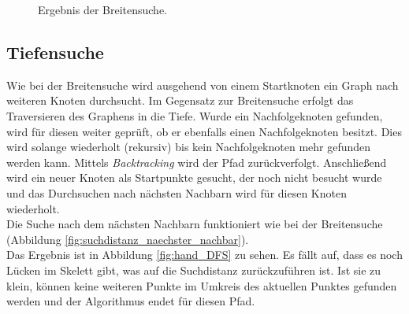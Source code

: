 \begin{figure}[htbp]
\begin{minipage}{5cm}
	\end{minipage}
	\caption{Ergebnis der Breitensuche.}
	\label{fig:hand_BFS}
	\end{figure}
\subsection{Tiefensuche}
\label{subsec:tiefensuche}
Wie bei der Breitensuche wird ausgehend von einem Startknoten ein Graph nach weiteren Knoten durchsucht. 
Im Gegensatz zur Breitensuche erfolgt das Traversieren des Graphens in die Tiefe. Wurde ein Nachfolgeknoten
gefunden, wird für diesen weiter geprüft, ob er ebenfalls einen Nachfolgeknoten besitzt. Dies wird
solange wiederholt (rekursiv) bis kein Nachfolgeknoten mehr gefunden werden kann. Mittels \emph{Backtracking} wird der Pfad zurückverfolgt. Anschließend wird ein neuer Knoten als Startpunkte gesucht, der noch nicht besucht wurde und das Durchsuchen nach nächsten Nachbarn wird für diesen Knoten wiederholt.\\
Die Suche nach dem nächsten Nachbarn funktioniert wie bei der Breitensuche (Abbildung \ref{fig:suchdistanz_naechster_nachbar}). \\
Das Ergebnis ist in Abbildung \ref{fig:hand_DFS} zu sehen. Es fällt auf, dass es noch Lücken im Skelett gibt, was auf die Suchdistanz zurückzuführen ist. Ist sie zu klein, können keine weiteren Punkte im Umkreis des aktuellen Punktes gefunden werden und der Algorithmus endet für diesen Pfad. 

